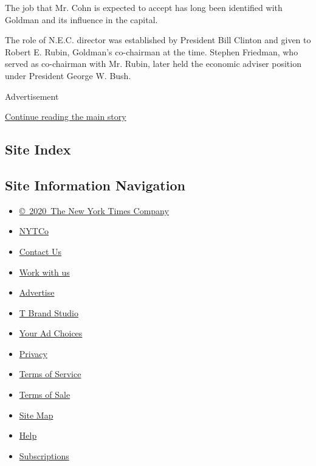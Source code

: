 The job that Mr. Cohn is expected to accept has long been identified
with Goldman and its influence in the capital.

The role of N.E.C. director was established by President Bill Clinton
and given to Robert E. Rubin, Goldman's co-chairman at the time. Stephen
Friedman, who served as co-chairman with Mr. Rubin, later held the
economic adviser position under President George W. Bush.

Advertisement

\protect\hyperlink{after-bottom}{Continue reading the main story}

\hypertarget{site-index}{%
\subsection{Site Index}\label{site-index}}

\hypertarget{site-information-navigation}{%
\subsection{Site Information
Navigation}\label{site-information-navigation}}

\begin{itemize}
\tightlist
\item
  \href{https://help.nytimes.com/hc/en-us/articles/115014792127-Copyright-notice}{©~2020~The
  New York Times Company}
\end{itemize}

\begin{itemize}
\tightlist
\item
  \href{https://www.nytco.com/}{NYTCo}
\item
  \href{https://help.nytimes.com/hc/en-us/articles/115015385887-Contact-Us}{Contact
  Us}
\item
  \href{https://www.nytco.com/careers/}{Work with us}
\item
  \href{https://nytmediakit.com/}{Advertise}
\item
  \href{http://www.tbrandstudio.com/}{T Brand Studio}
\item
  \href{https://www.nytimes.com/privacy/cookie-policy\#how-do-i-manage-trackers}{Your
  Ad Choices}
\item
  \href{https://www.nytimes.com/privacy}{Privacy}
\item
  \href{https://help.nytimes.com/hc/en-us/articles/115014893428-Terms-of-service}{Terms
  of Service}
\item
  \href{https://help.nytimes.com/hc/en-us/articles/115014893968-Terms-of-sale}{Terms
  of Sale}
\item
  \href{https://spiderbites.nytimes.com}{Site Map}
\item
  \href{https://help.nytimes.com/hc/en-us}{Help}
\item
  \href{https://www.nytimes.com/subscription?campaignId=37WXW}{Subscriptions}
\end{itemize}

